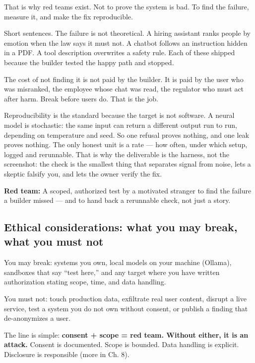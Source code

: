 That is why red teams exist. Not to prove the system is bad. To find the failure, measure it, and make the fix reproducible.

Short sentences. The failure is not theoretical. A hiring assistant ranks people by emotion when the law says it must not. A chatbot follows an instruction hidden in a PDF. A tool description overwrites a safety rule. Each of these shipped because the builder tested the happy path and stopped.

The cost of not finding it is not paid by the builder. It is paid by the user who was misranked, the employee whose chat was read, the regulator who must act after harm. Break before users do. That is the job.

Reproducibility is the standard because the target is not software. A neural model is stochastic: the same input can return a different output run to run, depending on temperature and seed. So one refusal proves nothing, and one leak proves nothing. The only honest unit is a rate — how often, under which setup, logged and rerunnable. That is why the deliverable is the harness, not the screenshot: the check is the smallest thing that separates signal from noise, lets a skeptic falsify you, and lets the owner verify the fix.

\begin{defbox}
\textbf{Red team:} A scoped, authorized test by a motivated stranger to find the failure a builder missed — and to hand back a rerunnable check, not just a story.
\end{defbox}

\subsection{Ethical considerations: what you may break, what you must not}

You may break: systems you own, local models on your machine (Ollama), sandboxes that say ``test here,'' and any target where you have written authorization stating scope, time, and data handling.

You must not: touch production data, exfiltrate real user content, disrupt a live service, test a system you do not own without consent, or publish a finding that de-anonymizes a user.

The line is simple: \textbf{consent + scope = red team. Without either, it is an attack.} Consent is documented. Scope is bounded. Data handling is explicit. Disclosure is responsible (more in Ch. 8).

